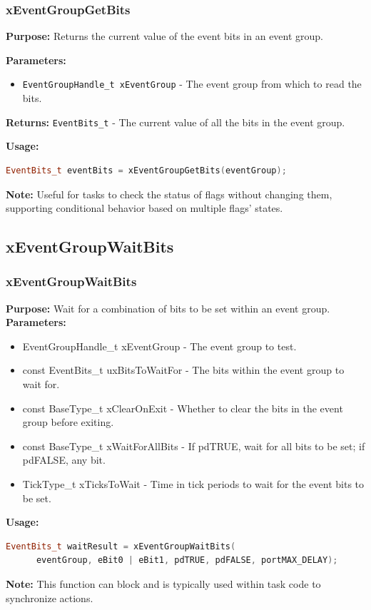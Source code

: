\documentclass[10pt]{beamer}
\begin{document}
\begin{frame}[fragile]
    \frametitle{xEventGroupGetBits}
    \textbf{Purpose:} Returns the current value of the event bits in an event group.
    
    \textbf{Parameters:}
    \begin{itemize}
      \item \texttt{EventGroupHandle\_t xEventGroup} - The event group from which to read the bits.
    \end{itemize}
    
    \textbf{Returns:} \texttt{EventBits\_t} - The current value of all the bits in the event group.
    
    \textbf{Usage:}
    \begin{lstlisting}[language=C++, basicstyle=\ttfamily\small]
  EventBits_t eventBits = xEventGroupGetBits(eventGroup);
    \end{lstlisting}
    
    \textbf{Note:} Useful for tasks to check the status of flags without changing them, supporting conditional behavior based on multiple flags' states.
\end{frame}


\subsection{xEventGroupWaitBits}

\begin{frame}[fragile]
    \frametitle{xEventGroupWaitBits}
    \textbf{Purpose:} Wait for a combination of bits to be set within an event group.
    \textbf{Parameters:}
    \begin{itemize}
      \item EventGroupHandle\_t xEventGroup - The event group to test.
      \item const EventBits\_t uxBitsToWaitFor - The bits within the event group to wait for.
      \item const BaseType\_t xClearOnExit - Whether to clear the bits in the event group before exiting.
      \item const BaseType\_t xWaitForAllBits - If pdTRUE, wait for all bits to be set; if pdFALSE, any bit.
      \item TickType\_t xTicksToWait - Time in tick periods to wait for the event bits to be set.
    \end{itemize}
    \textbf{Usage:}
    \begin{lstlisting}[language=C++, basicstyle=\ttfamily\small]
  EventBits_t waitResult = xEventGroupWaitBits(
      eventGroup, eBit0 | eBit1, pdTRUE, pdFALSE, portMAX_DELAY);
    \end{lstlisting}
    \textbf{Note:} This function can block and is typically used within task code to synchronize actions.
\end{frame}
\end{document}
